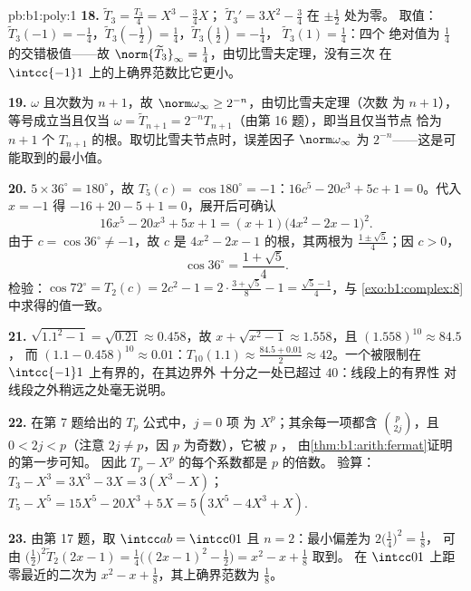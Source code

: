 \begin{solution}{pb:b1:poly:1}
\textbf{18.} $\widetilde T_3 = \frac{T_3}4 = X^3 - \frac34X$；
$\widetilde T_3{}' = 3X^2 - \frac34$ 在 $\pm\frac12$ 处为零。
取值：$\widetilde T_3(-1) = -\frac14$，$\widetilde
T_3(-\tfrac12) = \frac14$，$\widetilde T_3(\tfrac12) = -\frac14$，
$\widetilde T_3(1) = \frac14$：四个
绝对值为 $\frac14$ 的交错极值——故 $\norm{\widetilde T_3}_\infty =
\frac14$，由切比雪夫定理，没有三次
在 $\intcc{-1}1$ 上的上确界范数比它更小。

\textbf{19.} $\omega$ 且次数为 $n + 1$，故
$\norm\omega_\infty \geq 2^{-n}$，由切比雪夫定理（次数
为 $n+1$），等号成立当且仅当 $\omega = \widetilde T_{n+1}
= 2^{-n}T_{n+1}$（由第 16 题），即当且仅当节点
恰为 $n + 1$ 个 $T_{n+1}$ 的根。取切比雪夫节点时，误差因子
$\norm\omega_\infty$ 为 $2^{-n}$——这是可能取到的最小值。

\textbf{20.} $5 \times 36^\circ = 180^\circ$，故 $T_5(c) =
\cos180^\circ = -1$：$16c^5 - 20c^3 + 5c + 1 = 0$。代入 $x =
-1$ 得 $-16 + 20 - 5 + 1 = 0$，展开后可确认
\[
16x^5 - 20x^3 + 5x + 1 = (x + 1)\bigl(4x^2 - 2x - 1\bigr)^2 .
\]
由于 $c = \cos36^\circ \neq -1$，故 $c$ 是 $4x^2 - 2x -
1$ 的根，其两根为 $\frac{1 \pm \sqrt5}4$；因 $c > 0$，
\[
\cos36^\circ = \frac{1 + \sqrt5}4 .
\]
检验：$\cos72^\circ = T_2(c) = 2c^2 - 1 = 2\cdot\frac{3 +
\sqrt5}8 - 1 = \frac{\sqrt5 - 1}4$，与
\cref{exo:b1:complex:8}中求得的值一致。

\textbf{21.} $\sqrt{1.1^2 - 1} = \sqrt{0.21} \approx 0.458$，故
$x + \sqrt{x^2-1} \approx 1.558$，且 $(1.558)^{10} \approx 84.5$，
而 $(1.1 - 0.458)^{10} \approx 0.01$：$T_{10}(1.1) \approx
\frac{84.5 + 0.01}2 \approx 42$。一个被限制在
$\intcc{-1}1$ 上有界的，在其边界外
十分之一处已超过 $40$：线段上的有界性
对线段之外稍远之处毫无说明。

\textbf{22.} 在第 7 题给出的 $T_p$ 公式中，$j = 0$ 项
为 $X^p$；其余每一项都含 $\binom p{2j}$，且 $0 < 2j <
p$（注意 $2j \neq p$，因 $p$ 为奇数），它被 $p$ ，
由\cref{thm:b1:arith:fermat}证明的第一步可知。
因此 $T_p - X^p$ 的每个系数都是 $p$ 的倍数。
验算：$T_3 - X^3 = 3X^3 - 3X = 3(X^3 - X)$；$T_5 - X^5 = 15X^5
- 20X^3 + 5X = 5(3X^5 - 4X^3 + X)$.

\textbf{23.} 由第 17 题，取 $\intcc ab = \intcc01$ 且 $n =
2$：最小偏差为 $2\bigl(\frac14\bigr)^2 = \frac18$，
可由 $\bigl(\frac12\bigr)^2\widetilde T_2(2x - 1) =
\frac14\bigl((2x-1)^2 - \frac12\bigr) = x^2 - x + \frac18$ 取到。
在 $\intcc01$ 上距零最近的二次为 $x^2 - x +
\frac18$，其上确界范数为 $\frac18$。


\end{solution}
